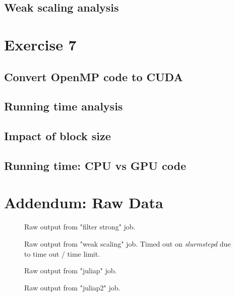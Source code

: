 \documentclass[a4paper,%
11pt,%
DIV12,
headsepline,%
headings=normal,
]{scrartcl}
\begin{document}
\subsection{Weak scaling analysis}

\section{Exercise 7}

\subsection{Convert OpenMP code to CUDA}

\subsection{Running time analysis}

\subsection{Impact of block size}

\subsection{Running time: CPU vs GPU code}

\newpage

\section{Addendum: Raw Data}

\begin{figure}[htbp]
    \centering
    \label{tab:filter_strong}
    \caption{Raw output from "filter strong" job.}
\end{figure}

\begin{figure}[htbp]
    \centering
    \label{tab:filter_weak}
    \caption{Raw output from "weak scaling" job. Timed out on \textit{slurmstepd} due to time out / time limit.}
\end{figure}

\begin{figure}[htbp]
    \centering
    \label{tab:juliap}
    \caption{Raw output from "juliap" job.}
\end{figure}

\begin{figure}[htbp]
    \centering
    \label{tab:juliap2}
    \caption{Raw output from "juliap2" job.}
\end{figure}
\end{document}
